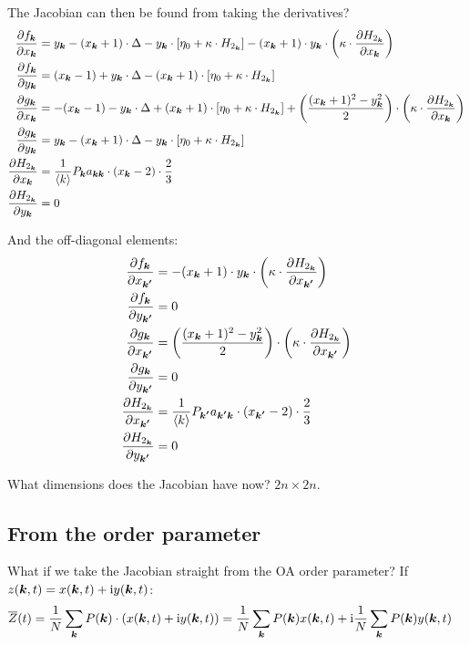 The Jacobian can then be found from taking the derivatives?
\begin{align*}
\frac{\partial f_{{\boldsymbol{k}}}}{\partial x_{{\boldsymbol{k}}}} &= y_{{\boldsymbol{k}}}-(x_{{\boldsymbol{k}}}+1) \cdot \Delta-y_{{\boldsymbol{k}}} \cdot \left[\eta_{0} + \kappa \cdot H_{2_{{\boldsymbol{k}}}} \right] - (x_{{\boldsymbol{k}}}+1) \cdot y_{{\boldsymbol{k}}} \cdot \left(\kappa \cdot \frac{\partial H_{2_{{\boldsymbol{k}}}}}{\partial x_{{\boldsymbol{k}}}}\right)\\
\frac{\partial f_{{\boldsymbol{k}}}}{\partial y_{{\boldsymbol{k}}}} &= (x_{{\boldsymbol{k}}}-1)+y_{{\boldsymbol{k}}} \cdot \Delta-(x_{{\boldsymbol{k}}}+1) \cdot \left[\eta_{0} + \kappa \cdot H_{2_{{\boldsymbol{k}}}} \right] \\
\frac{\partial g_{{\boldsymbol{k}}}}{\partial x_{{\boldsymbol{k}}}} &= -(x_{{\boldsymbol{k}}} - 1) - y_{{\boldsymbol{k}}} \cdot \Delta + (x_{{\boldsymbol{k}}} + 1) \cdot \left[\eta_{0} + \kappa \cdot H_{2_{{\boldsymbol{k}}}} \right] + \left( \frac{(x_{{\boldsymbol{k}}} + 1)^2 - y_{{\boldsymbol{k}}}^2}{2} \right) \cdot \left(\kappa \cdot \frac{\partial H_{2_{{\boldsymbol{k}}}}}{\partial x_{{\boldsymbol{k}}}}\right) \\
\frac{\partial g_{{\boldsymbol{k}}}}{\partial y_{{\boldsymbol{k}}}} &= y_{{\boldsymbol{k}}} - (x_{{\boldsymbol{k}}} + 1)\cdot \Delta - y_{{\boldsymbol{k}}} \cdot \left[\eta_{0} + \kappa \cdot H_{2_{{\boldsymbol{k}}}} \right] \\
\frac{\partial H_{2_{{\boldsymbol{k}}}}}{\partial x_{{\boldsymbol{k}}}} &= \frac{1}{\langle k\rangle} P_{{\boldsymbol{k}}} a_{{\boldsymbol{k}} {\boldsymbol{k}}} \cdot(x_{{\boldsymbol{k}}}-2) \cdot \frac{2}{3} \\
\frac{\partial H_{2_{{\boldsymbol{k}}}}}{\partial y_{{\boldsymbol{k}}}} &= 0 
\end{align*}

And the off-diagonal elements:
\begin{align*}
\frac{\partial f_{{\boldsymbol{k}}}}{\partial x_{{\boldsymbol{k'}}}} &= - (x_{{\boldsymbol{k}}}+1) \cdot y_{{\boldsymbol{k}}} \cdot \left(\kappa \cdot \frac{\partial H_{2_{{\boldsymbol{k}}}}}{\partial x_{{\boldsymbol{k'}}}}\right)\\
\frac{\partial f_{{\boldsymbol{k}}}}{\partial y_{{\boldsymbol{k'}}}} &= 0 \\
\frac{\partial g_{{\boldsymbol{k}}}}{\partial x_{{\boldsymbol{k'}}}} &= \left( \frac{(x_{{\boldsymbol{k}}} + 1)^2 - y_{{\boldsymbol{k}}}^2}{2} \right) \cdot \left(\kappa \cdot \frac{\partial H_{2_{{\boldsymbol{k}}}}}{\partial x_{{\boldsymbol{k'}}}}\right) \\
\frac{\partial g_{{\boldsymbol{k}}}}{\partial y_{{\boldsymbol{k'}}}} &= 0\\
\frac{\partial H_{2_{{\boldsymbol{k}}}}}{\partial x_{{\boldsymbol{k'}}}} &= \frac{1}{\langle k\rangle} P_{{\boldsymbol{k'}}} a_{{\boldsymbol{k'}} {\boldsymbol{k}}} \cdot(x_{{\boldsymbol{k'}}}-2) \cdot \frac{2}{3} \\
\frac{\partial H_{2_{{\boldsymbol{k}}}}}{\partial y_{{\boldsymbol{k'}}}} &= 0
\end{align*}

What dimensions does the Jacobian have now? $2 n \times 2 n$.

 


\subsection{From the order parameter}
What if we take the Jacobian straight from the OA order parameter? If $z({\boldsymbol{k}},t) = x({\boldsymbol{k}},t) + {\rm{i}} y({\boldsymbol{k}},t)$:
\begin{align}
\overline{Z}(t) &= \frac{1}{N} \sum_{{\boldsymbol{k}}} P({\boldsymbol{k}}) \cdot \left( x({\boldsymbol{k}},t) + {\rm{i}} y({\boldsymbol{k}},t) \right) = \frac{1}{N} \sum_{{\boldsymbol{k}}} P({\boldsymbol{k}}) x({\boldsymbol{k}},t) + {\rm{i}} \frac{1}{N} \sum_{{\boldsymbol{k}}} P({\boldsymbol{k}}) y({\boldsymbol{k}},t)  
\end{align}




\small{}

\label{LastPage}~


